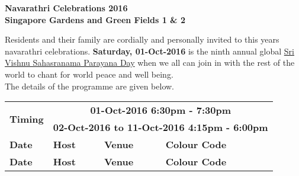 \documentclass[12pt]{article}
\begin{document}
\pagestyle{empty}
\begin{center}
\textbf{Navarathri Celebrations 2016\\Singapore Gardens and Green Fields 1 \& 2}\\
\end{center}
Residents and their family are cordially and personally invited to this year\textquotesingle s navarathri celebrations. \textbf{Saturday, 01-Oct-2016} is the ninth annual global  \underline{\textquotesingle Sri Vishnu Sahasranama Parayana Day\textquotesingle } when we all can join in with the rest of the world to chant for world peace and well being. \\The details of the programme are given below. 
\begin{center}
\begin{longtable}{|p{}|p{}|p{}|p{}|}
\hline \multirow{2}{*}{\textbf{Timing}}&\multicolumn{3}{|c|}{\textbf{01-Oct-2016  \hfill 6:30pm - 7:30pm}}\\\cline{2-4}
&\multicolumn{3}{|c|}{\textbf{02-Oct-2016 to 11-Oct-2016 \hfill 4:15pm - 6:00pm}}\\
\hline \textbf{Date}&\textbf{Host}&\textbf{Venue}&\textbf{Colour Code}\\\hline
\endfirsthead
\hline \textbf{Date}&\textbf{Host}&\textbf{Venue}&\textbf{Colour Code}\\\hline
\endhead


\end{longtable}
\end{center}
\end{document}
